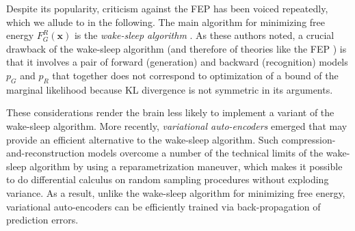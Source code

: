 \documentclass[10pt,letterpaper]{article}
\def\x{\mathbf{x}}
\begin{document}
Despite its popularity, criticism against the FEP has been voiced repeatedly,
which we allude to in the following.
The main algorithm for minimizing free energy $F_G^R(\x)$ is the \textit{wake-sleep algorithm}
\citep{dayan1995helmholtz}. As these authors noted,
a crucial drawback of the wake-sleep algorithm (and therefore of theories like the FEP \citep{friston2010free}) is that it involves a pair
of forward (generation) and backward (recognition) models $p_G$ and $p_R$ that
together does not correspond to optimization of a bound of the marginal likelihood
because KL divergence is not symmetric in its arguments.



These considerations render the brain less likely to implement
a variant of the wake-sleep algorithm. More recently,
\textit{variational auto-encoders} \citep{kingma2013auto} emerged that may provide an efficient alternative to the wake-sleep algorithm. Such compression-and-reconstruction models
overcome a number of the technical limits of the wake-sleep algorithm
by using a reparametrization maneuver, which makes it possible to do differential calculus on random sampling procedures without exploding variance. As a result, unlike the wake-sleep algorithm
for minimizing free energy,
variational auto-encoders can be efficiently trained via back-propagation of prediction errors.
\end{document}
